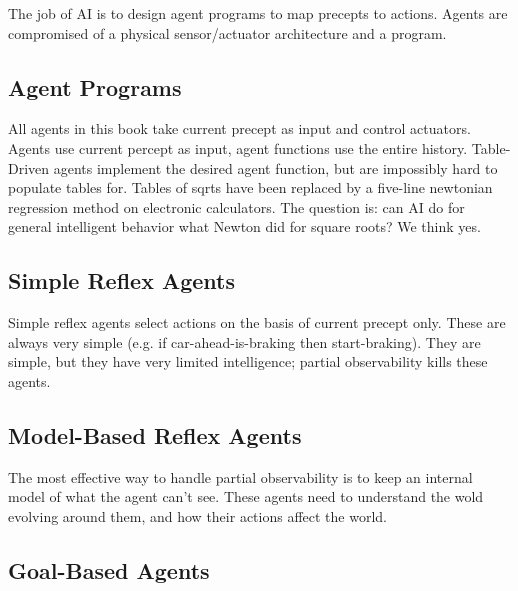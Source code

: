 The job of AI is to design agent programs to map precepts to actions.
Agents are compromised of a physical sensor/actuator architecture and a program.

\subsection{Agent Programs} %
\label{sub:agent_programs}

All agents in this book take current precept as input and control actuators.
Agents use current percept as input, agent functions use the entire history.
Table-Driven agents implement the desired agent function, but are impossibly
hard to populate tables for.
Tables of sqrts have been replaced by a five-line newtonian regression method on
electronic calculators.
The question is: can AI do for general intelligent behavior what Newton did for
square roots? We think yes.


\subsection{Simple Reflex Agents} %
\label{sub:simple_reflex_agents}

Simple reflex agents select actions on the basis of current precept only.
These are always very simple (e.g. if car-ahead-is-braking then start-braking).
They are simple, but they have very limited intelligence; partial observability
kills these agents.


\subsection{Model-Based Reflex Agents} %
\label{sub:model_based_reflex_agents}

The most effective way to handle partial observability is to keep an internal
model of what the agent can't see.
These agents need to understand the wold evolving around them, and how their
actions affect the world.


\subsection{Goal-Based Agents} %
\label{sub:goal_based_agents}


